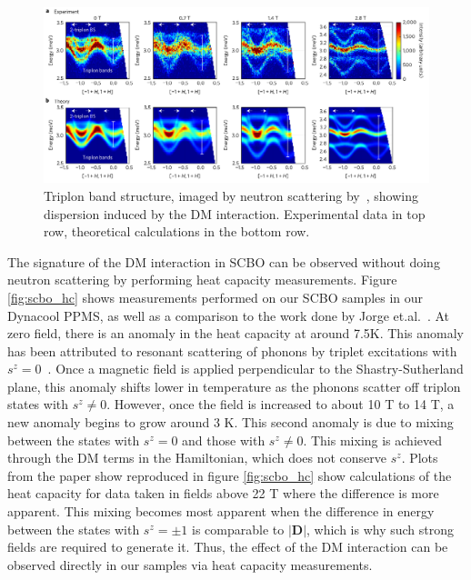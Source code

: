 \documentclass{thesis-umich}
\begin{document}
\begin{figure}
	\centering
	\caption[Triplon Bands in SCBO]{Triplon band structure, imaged by neutron scattering by~\cite{McClarty2017}, showing dispersion induced by the DM interaction. Experimental data in top row, theoretical calculations in the bottom row.}
	\label{fig:scbo_triplon_bands}
	\includegraphics[width=\columnwidth]{figures/SCBO_triplon_bands_McClarty.pdf}
\end{figure}

The signature of the DM interaction in SCBO can be observed without doing neutron scattering by performing heat capacity measurements. Figure \ref{fig:scbo_hc} shows measurements performed on our SCBO samples in our Dynacool PPMS, as well as a comparison to the work done by Jorge et.al.~\cite{Jorge2005}. At zero field, there is an anomaly in the heat capacity at around 7.5K. This anomaly has been attributed to resonant scattering of phonons by triplet excitations with $s^z = 0$~\cite{Hofmann2001}. Once a magnetic field is applied perpendicular to the Shastry-Sutherland plane, this anomaly shifts lower in temperature as the phonons scatter off triplon states with $s^z \neq 0$. However, once the field is increased to about 10 T to 14 T, a new anomaly begins to grow around 3 K. This second anomaly is due to mixing between the states with $s^z = 0$ and those with $s^z \neq 0$. This mixing is achieved through the DM terms in the Hamiltonian, which does not conserve $s^z$. Plots from the paper show reproduced in figure \ref{fig:scbo_hc} show calculations of the heat capacity for data taken in fields above 22 T where the difference is more apparent. This mixing becomes most apparent when the difference in energy between the states with $s^z = \pm 1$ is comparable to $|\mathbf{D}|$, which is why such strong fields are required to generate it. Thus, the effect of the DM interaction can be observed directly in our samples via heat capacity measurements.
\end{document}
